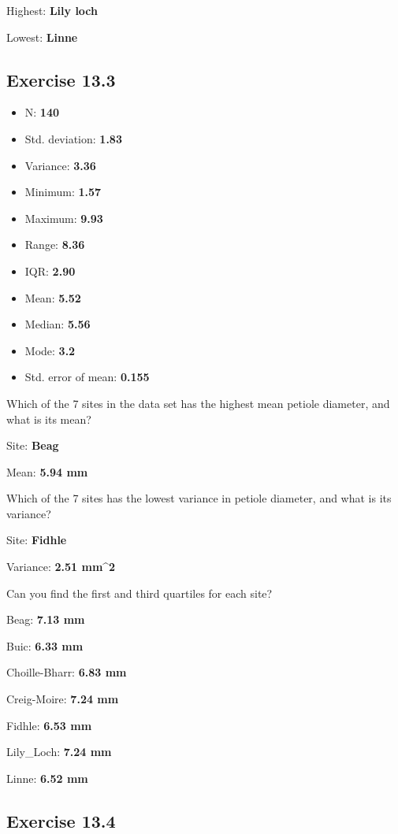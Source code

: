 \documentclass[
  openany]{krantz}
\providecommand{\tightlist}{%
  \setlength{\itemsep}{0pt}\setlength{\parskip}{0pt}}
\begin{document}
Highest: \textbf{Lily loch}

Lowest: \textbf{Linne}

\hypertarget{exercise-13.3}{%
\subsection{Exercise 13.3}\label{exercise-13.3}}

\begin{itemize}
\tightlist
\item
  N: \textbf{140}
\item
  Std. deviation: \textbf{1.83}
\item
  Variance: \textbf{3.36}
\item
  Minimum: \textbf{1.57}
\item
  Maximum: \textbf{9.93}
\item
  Range: \textbf{8.36}
\item
  IQR: \textbf{2.90}
\item
  Mean: \textbf{5.52}
\item
  Median: \textbf{5.56}
\item
  Mode: \textbf{3.2}
\item
  Std. error of mean: \textbf{0.155}
\end{itemize}

Which of the 7 sites in the data set has the highest mean petiole diameter, and what is its
mean?

Site: \textbf{Beag}

Mean: \textbf{5.94 mm}

Which of the 7 sites has the lowest variance in petiole diameter, and what is its variance?

Site: \textbf{Fidhle}

Variance: \textbf{2.51 mm\^{}2}

Can you find the first and third quartiles for each site?

Beag: \textbf{7.13 mm}

Buic: \textbf{6.33 mm}

Choille-Bharr: \textbf{6.83 mm}

Creig-Moire: \textbf{7.24 mm}

Fidhle: \textbf{6.53 mm}

Lily\_Loch: \textbf{7.24 mm}

Linne: \textbf{6.52 mm}

\hypertarget{exercise-13.4}{%
\subsection{Exercise 13.4}\label{exercise-13.4}}
\end{document}
